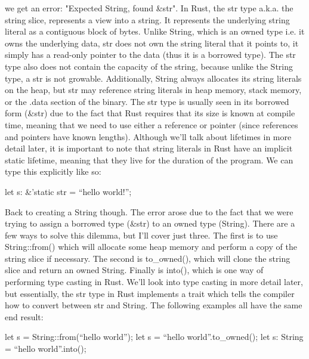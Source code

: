 \documentclass{article}
\begin{document}
we get an error: "Expected String, found \&str". In Rust, the str type a.k.a. the string slice, 
represents a view into a string. It represents the underlying string literal as a contiguous block of bytes. 
Unlike String, which is an owned type i.e. it owns the underlying data, str does not own the string literal 
that it points to, it simply has a read-only pointer to the data (thus it is a borrowed type). The str type 
also does not contain the capacity of the string, because unlike the String type, a str is not growable. 
Additionally, String always allocates its string literals on the heap, but str may reference string literals 
in heap memory, stack memory, or the .data section of the binary. The str type is usually seen in its borrowed 
form (\&str) due to the fact that Rust requires that its size is known at compile time, meaning that we need 
to use either a reference or pointer (since references and pointers have known lengths). Although we’ll talk 
about lifetimes in more detail later, it is important to note that string literals in Rust have an implicit 
static lifetime, meaning that they live for the duration of the program. We can type this explicitly like so: 

\begin{rustlst}

let s: &’static str = “hello world!”; 

\end{rustlst}

Back to creating a String though. The error arose due to the fact that we were trying to assign a borrowed 
type (\&str) to an owned type (String). There are a few ways to solve this dilemma, but I’ll cover just three. 
The first is to use String::from() which will allocate some heap memory and perform a copy of the string 
slice if necessary. The second is to\_owned(), which will clone the string slice and return an owned String. 
Finally is into(), which is one way of performing type casting in Rust. We’ll look into type casting in more 
detail later, but essentially, the str type in Rust implements a trait which tells the compiler how to convert 
between str and String. The following examples all have the same end result:

\begin{rustlst}

let s = String::from(“hello world”);
let s = “hello world”.to_owned();
let s: String = “hello world”.into(); 

\end{rustlst}
\end{document}
